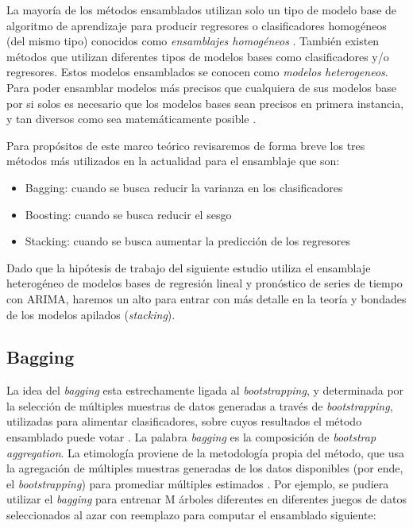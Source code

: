 \begin{spacing}{1.5}
La mayoría de los métodos ensamblados utilizan solo un tipo de modelo base de algoritmo de aprendizaje para producir regresores o clasificadores homogéneos (del mismo tipo) conocidos como \textit{ensamblajes homogéneos} \cite{smolyakov}. También existen métodos que utilizan diferentes tipos de modelos bases como clasificadores y/o regresores. Estos modelos ensamblados se conocen como \textit{modelos heterogeneos}. Para poder ensamblar modelos más precisos que cualquiera de sus modelos base por si solos es necesario que los modelos bases sean precisos en primera instancia, y tan diversos como sea matemáticamente posible \cite{smolyakov}.

Para propósitos de este marco teórico revisaremos de forma breve los tres métodos más utilizados en la actualidad para el ensamblaje que son:
\begin{itemize}
  \item Bagging: cuando se busca reducir la varianza en los clasificadores
  \item Boosting: cuando se busca reducir el sesgo 
  \item Stacking: cuando se busca aumentar la predicción de los regresores
\end{itemize}

Dado que la hipótesis de trabajo del siguiente estudio utiliza el ensamblaje heterogéneo de modelos bases de regresión lineal y pronóstico de series de tiempo con ARIMA, haremos un alto para entrar con más detalle en la teoría y bondades de los modelos apilados (\emph{stacking}).

\subsection{Bagging}
La idea del \emph{bagging} esta estrechamente ligada al \emph{bootstrapping}, y determinada por la selección de múltiples muestras de datos generadas a través de \emph{bootstrapping}, utilizadas para alimentar clasificadores, sobre cuyos resultados el método ensamblado puede votar \cite{daume}. La palabra \emph{bagging} es la composición de \emph{bootstrap aggregation}. La etimología proviene de la metodología propia del método, que usa la agregación de múltiples muestras generadas de los datos disponibles (por ende, el \emph{bootstrapping}) para promediar múltiples estimados \cite{smolyakov}. 
Por ejemplo, se pudiera utilizar el \emph{bagging} para entrenar M árboles diferentes en diferentes juegos de datos seleccionados al azar con reemplazo para computar el ensamblado siguiente:  


\end{spacing}
